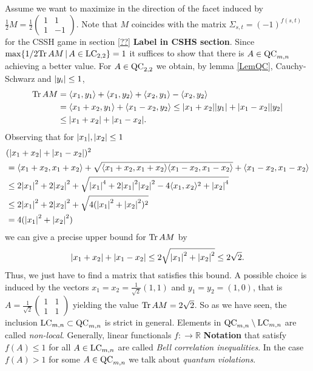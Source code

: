Assume we want to maximize in the direction of the facet induced by $ \frac{1}{2}M = \frac{1}{2}\begin{pmatrix}
1 & 1 \\ 1 & -1 
\end{pmatrix} $. Note that $ M $ coincides with the matrix $ \Sigma_{s,t} = (-1)^{f(s,t)} $ for the CSSH game in section \ref{??} \textbf{Label in CSHS section}. Since $ \max \{  1/2 \text{Tr} \, {AM} \, | \, A \in \textup{LC}_{2,2} \} = 1 $ it suffices to show that there is $ A \in \textup{QC}_{m,n} $ achieving a better value. For $ A \in \textup{QC}_{2,2} $ we obtain, by lemma \ref{LemQC}, Cauchy-Schwarz and $ {\left|{y_i}\right|}\le 1 $,
\begin{align*}
	\text{Tr} \, {AM} &= \langle x_1,y_1 \rangle + \langle x_1,y_2 \rangle + \langle x_2,y_1 \rangle - \langle x_2,y_2 \rangle   \\
	&= \langle x_1+x_2,y_1 \rangle + \langle x_1-x_2,y_2 \rangle  \le {\left|{x_1+x_2}\right|}{\left|{y_1}\right|} + {\left|{x_1-x_2}\right|}{\left|{y_2}\right|}  \\
	&\le {\left|{x_1+x_2}\right|} + {\left|{x_1-x_2}\right|}.
\end{align*} 
Observing that for $ {\left|{x_1}\right|},{\left|{x_2}\right|}\le  1 $
\begin{align*}
	&({\left|{x_1+x_2}\right|} + {\left|{x_1-x_2}\right|})^2 \\
	&= \langle x_1+x_2,x_1+x_2\rangle  +\sqrt{\langle x_1+x_2,x_1+x_2\rangle  \langle x_1-x_2,x_1-x_2\rangle} +  \langle x_1-x_2,x_1-x_2\rangle  \\
	&\le 2{\left|{x_1}\right|}^2+2{\left|{x_2}\right|}^2 + \sqrt{{\left|{x_1}\right|}^4+2{\left|{x_1}\right|}^2{\left|{x_2}\right|}^2-4\langle x_1,x_2\rangle^2+{\left|{x_2}\right|}^4}  \\
	&\le  2{\left|{x_1}\right|}^2+2{\left|{x_2}\right|}^2 + \sqrt{4({\left|{x_1}\right|}^2+{\left|{x_2}\right|}^2)^2}  \\
	&= 4({\left|{x_1}\right|}^2+{\left|{x_2}\right|}^2)
\end{align*}
we can give a precise upper bound for $ \text{Tr} \, {AM}  $ by 
\begin{align*}
	{\left|{x_1+x_2}\right|} + {\left|{x_1-x_2}\right|} \le 2\sqrt{{\left|{x_1}\right|}^2+{\left|{x_2}\right|}^2} \le 2 \sqrt{2}.
\end{align*}
Thus, we just have to find a matrix that satisfies this bound. A possible choice is induced by the vectors $ x_1 = x_2 = \frac{1}{\sqrt{2}}(1,1) $ and $ y_1 = y_2 =(1,0) $, that is $ A = \frac{1}{\sqrt{2}}\begin{pmatrix}
1 & 1 \\ 1 & 1 
\end{pmatrix} $ yielding the value $ \text{Tr} \, {AM}  = 2 \sqrt{2} $.
So as we have seen, the inclusion $ \textup{LC}_{m,n} \subset \textup{QC}_{m,n} $ is strict in general. Elements in $ \textup{QC}_{m,n} \setminus \textup{LC}_{m,n} $ are called {\itshape non-local}.
Generally, linear functionals $ f: \to \mathbb{R} $ \textbf{Notation} that satisfy $ f(A) \le 1 $ for all $ A \in \textup{LC}_{m,n} $ are called {\itshape Bell correlation inequalities}. In the case $ f(A) > 1 $ for some $ A \in \textup{QC}_{m,n} $ we talk about {\itshape quantum violations}. 